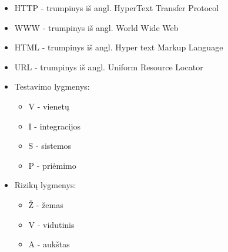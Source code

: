 \begin{itemize}
	\item HTTP - trumpinys iš angl. HyperText Transfer Protocol
	\item WWW - trumpinys iš angl. World Wide Web
	\item HTML - trumpinys iš angl. Hyper text Markup Language
	\item URL - trumpinys iš angl. Uniform Resource Locator
	\item Testavimo lygmenys:
		\begin{itemize}
			\item V - vienetų
			\item I - integracijos
			\item S - sistemos
			\item P - priėmimo
		\end{itemize}
	\item Rizikų lygmenys:
		\begin{itemize}
			\item Ž - žemas
			\item V - vidutinis
			\item A - aukštas
		\end{itemize}
\end{itemize}

